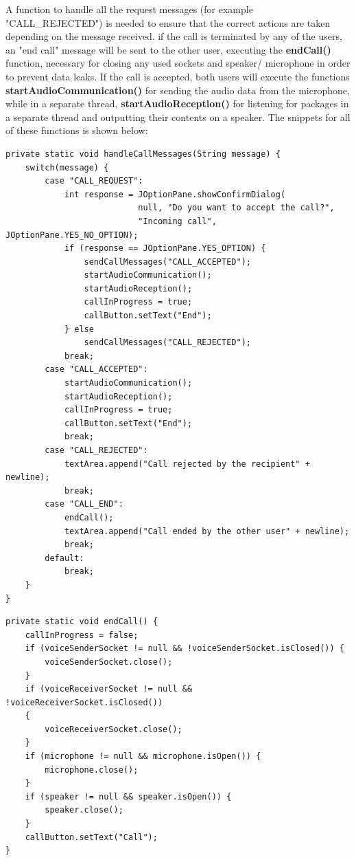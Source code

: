 \documentclass[12pt]{report}
\begin{document}
\newpage
A function to handle all the request messages (for example "CALL\_REJECTED") is needed to ensure that the correct actions are taken depending on the message received. if the call is terminated by any of the users, an "end call" message will be sent to the other user, executing the \textbf{endCall()} function, necessary for closing any used sockets and speaker/ microphone in order to prevent data leaks. If the call is accepted, both users will execute the functions \textbf{startAudioCommunication()} for sending the audio data from the microphone, while in a separate thread, \textbf{startAudioReception()} for listening for packages in a separate thread and outputting their contents on a speaker. The snippets for all of these functions is shown below:
\begin{lstlisting}[style=javastyle]
private static void handleCallMessages(String message) {
	switch(message) {
		case "CALL_REQUEST":
			int response = JOptionPane.showConfirmDialog(
                           null, "Do you want to accept the call?", 
                           "Incoming call", JOptionPane.YES_NO_OPTION);
			if (response == JOptionPane.YES_OPTION) {
				sendCallMessages("CALL_ACCEPTED");
				startAudioCommunication();
				startAudioReception();
				callInProgress = true;
				callButton.setText("End");
			} else
				sendCallMessages("CALL_REJECTED");
			break;
		case "CALL_ACCEPTED":
			startAudioCommunication();
			startAudioReception();
			callInProgress = true;
			callButton.setText("End");
			break;
		case "CALL_REJECTED":
			textArea.append("Call rejected by the recipient" + newline);
			break;
		case "CALL_END":
			endCall();
			textArea.append("Call ended by the other user" + newline);
			break;
		default:
			break;
	}
}
\end{lstlisting}

\newpage
\begin{lstlisting}[style=javastyle]
private static void endCall() {
	callInProgress = false;
	if (voiceSenderSocket != null && !voiceSenderSocket.isClosed()) {
		voiceSenderSocket.close();
	}
	if (voiceReceiverSocket != null && !voiceReceiverSocket.isClosed())
    {
		voiceReceiverSocket.close();
	}
	if (microphone != null && microphone.isOpen()) {
		microphone.close();
	}
	if (speaker != null && speaker.isOpen()) {
		speaker.close();
	}
	callButton.setText("Call");
}
\end{lstlisting}
\end{document}
